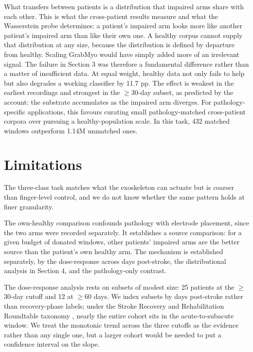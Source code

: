 \documentclass{article}
\begin{document}
What transfers between patients is a distribution that impaired arms share with each other. This is what the cross-patient results measure and what the Wasserstein probe determines: a patient's impaired arm looks more like another patient's impaired arm than like their own one. A healthy corpus cannot supply that distribution at any size, because the distribution is defined by departure from healthy. Scaling GrabMyo would have simply added more of an irrelevant signal. The failure in Section 3 was therefore a fundamental difference rather than a matter of insufficient data. At equal weight, healthy data not only fails to help but also degrades a working classifier by 11.7 pp. The effect is weakest in the earliest recordings and strongest in the $\geq$30-day subset, as predicted by the account: the substrate accumulates as the impaired arm diverges. For pathology-specific applications, this favours curating small pathology-matched cross-patient corpora over pursuing a healthy-population scale. In this task, 432 matched windows outperform 1.14M unmatched ones.

\section{Limitations}

The three-class task matches what the exoskeleton can actuate but is coarser than finger-level control, and we do not know whether the same pattern holds at finer granularity.

The own-healthy comparison confounds pathology with electrode placement, since the two arms were recorded separately. It establishes a source comparison: for a given budget of donated windows, other patients' impaired arms are the better source than the patient's own healthy arm. The mechanism is established separately, by the dose-response across days post-stroke, the distributional analysis in Section 4, and the pathology-only contrast.

The dose-response analysis rests on subsets of modest size: 25 patients at the $\geq$30-day cutoff and 12 at $\geq$60 days. We index subsets by days post-stroke rather than recovery-phase labels; under the Stroke Recovery and Rehabilitation Roundtable taxonomy \citep{bernhardt2017}, nearly the entire cohort sits in the acute-to-subacute window. We treat the monotonic trend across the three cutoffs as the evidence rather than any single one, but a larger cohort would be needed to put a confidence interval on the slope.
\end{document}
